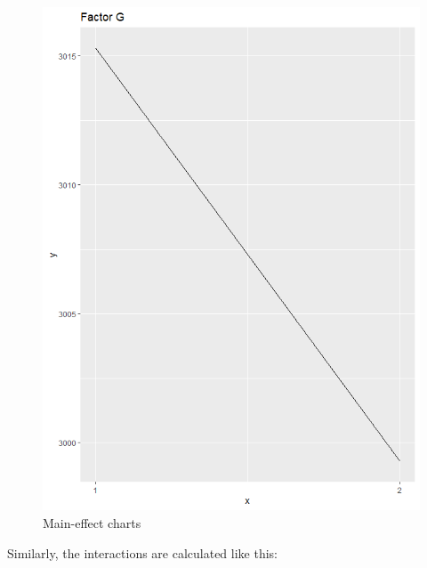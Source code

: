 \begin{figure}[H]
	\begin{minipage}[b]{0.33\linewidth}
		\centering
		\includegraphics[width=1\linewidth]{simulations/taguchi/plots/main_effect_g} 
	\end{minipage}
	\caption{Main-effect charts}
\end{figure}


Similarly, the interactions are calculated like this:


